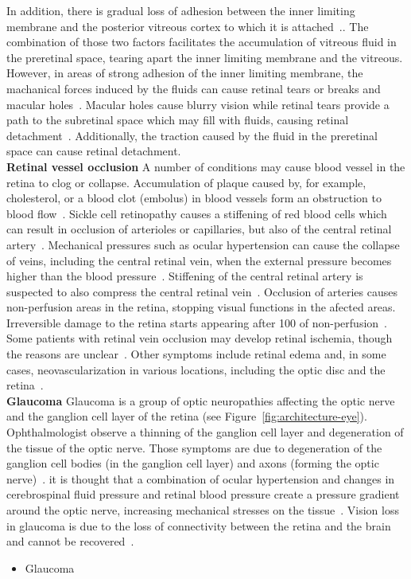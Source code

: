 \documentclass[12pt,a4paper]{journal}
\begin{document}
In addition, there is gradual loss of adhesion between the inner limiting membrane and the posterior vitreous cortex to which it is attached~\cite{Bottos_2012,Medina_2016}..
The combination of those two factors facilitates the accumulation of vitreous fluid in the preretinal space, tearing apart the inner limiting membrane and the vitreous.
However, in areas of strong adhesion of the inner limiting membrane, the machanical forces induced by the fluids can cause retinal tears or breaks and macular holes~\cite{Shechtman_2009}.
Macular holes cause blurry vision while retinal tears provide a path to the subretinal space which may fill with fluids, causing retinal detachment~\cite{Medina_2016}.
Additionally, the traction caused by the fluid in the preretinal space can cause retinal detachment.\\
\textbf{Retinal vessel occlusion}
A number of conditions may cause blood vessel in the retina to clog or collapse.
Accumulation of plaque caused by, for example, cholesterol, or a blood clot (embolus) in blood vessels form an obstruction to blood flow~\cite{Medina_2016}.
Sickle cell retinopathy causes a stiffening of red blood cells which can result in occlusion of arterioles or capillaries, but also of the central retinal artery~\cite{Medina_2016}.
Mechanical pressures such as ocular hypertension can cause the collapse of veins, including the central retinal vein, when the external pressure becomes higher than the blood pressure~\cite{Hayreh_2004}.
Stiffening of the central retinal artery is suspected to also compress the central retinal vein~\cite{Medina_2016}.
Occlusion of arteries causes non-perfusion areas in the retina, stopping visual functions in the afected areas.
Irreversible damage to the retina starts appearing after \SI{100}{\min} of non-perfusion~\cite{Hayreh_2004}.
Some patients with retinal vein occlusion may develop retinal ischemia, though the reasons are unclear~\cite{Khayat_2018}.
Other symptoms include retinal edema and, in some cases, neovascularization in various locations, including the optic disc and the retina~\cite{Medina_2016}.
\\
\textbf{Glaucoma}
Glaucoma is a group of optic neuropathies affecting the optic nerve and the ganglion cell layer of the retina (see Figure~\ref{fig:architecture-eye}).
Ophthalmologist observe a thinning of the ganglion cell layer and degeneration of the tissue of the optic nerve.
Those symptoms are due to degeneration of the ganglion cell bodies (in the ganglion cell layer) and axons (forming the optic nerve)~\cite{Quigley_2011}.
it is thought that a combination of ocular hypertension and changes in cerebrospinal fluid pressure and retinal blood pressure create a pressure gradient around the optic nerve, increasing mechanical stresses on the tissue~\cite{Band_2009,Nickells_2012}.
Vision loss in glaucoma is due to the loss of connectivity between the retina and the brain and cannot be recovered~\cite{Quigley_2011}. 



\begin{itemize}
\item Glaucoma
\end{itemize}



{\normalsize }
\end{document}
